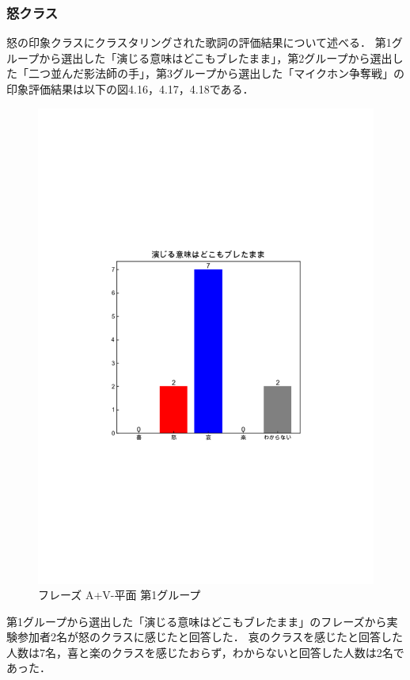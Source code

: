 \subsubsection{怒クラス}
怒の印象クラスにクラスタリングされた歌詞の評価結果について述べる．
第1グループから選出した「演じる意味はどこもブレたまま」，第2グループから選出した「二つ並んだ影法師の手」，第3グループから選出した「マイクホン争奪戦」の印象評価結果は以下の図4.16，4.17，4.18である．
\begin{figure}[H]
    \centering
    \includegraphics[width=14cm]{434.pdf}
    \vspace{-1mm}
    \caption{フレーズ A+V-平面 第1グループ}
    \label{fig:mms}
    \vspace{5mm}
\end{figure}
第1グループから選出した「演じる意味はどこもブレたまま」のフレーズから実験参加者2名が怒のクラスに感じたと回答した．
哀のクラスを感じたと回答した人数は7名，喜と楽のクラスを感じたおらず，わからないと回答した人数は2名であった．
